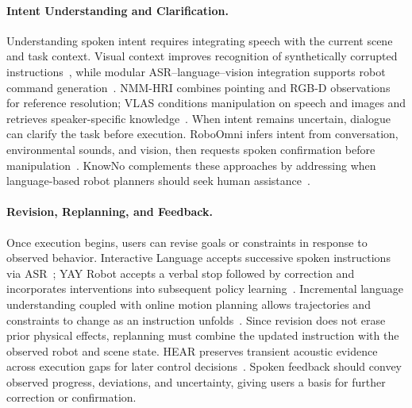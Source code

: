 \paragraph{Intent Understanding and Clarification.}
Understanding spoken intent requires integrating speech with the current scene and task context. Visual context improves recognition of synthetically corrupted instructions~\citep{emb_chang2023}, while modular ASR--language--vision integration supports robot command generation~\citep{emb_nwankwo2024}. NMM-HRI combines pointing and RGB-D observations for reference resolution; VLAS conditions manipulation on speech and images and retrieves speaker-specific knowledge~\citep{emb_lai2025nmm,emb_zhao2025vlas}. When intent remains uncertain, dialogue can clarify the task before execution. RoboOmni infers intent from conversation, environmental sounds, and vision, then requests spoken confirmation before manipulation~\citep{emb_wang2025roboomni}. KnowNo complements these approaches by addressing when language-based robot planners should seek human assistance~\citep{emb_ren2023knowno}.

\paragraph{Revision, Replanning, and Feedback.}
Once execution begins, users can revise goals or constraints in response to observed behavior. Interactive Language accepts successive spoken instructions via ASR~\citep{emb_lynch2022interactive}; YAY Robot accepts a verbal stop followed by correction and incorporates interventions into subsequent policy learning~\citep{emb_shi2024yay}. Incremental language understanding coupled with online motion planning allows trajectories and constraints to change as an instruction unfolds~\citep{emb_abrams2025incremental}. Since revision does not erase prior physical effects, replanning must combine the updated instruction with the observed robot and scene state. HEAR preserves transient acoustic evidence across execution gaps for later control decisions~\citep{emb_nie2026hear}. Spoken feedback should convey observed progress, deviations, and uncertainty, giving users a basis for further correction or confirmation.


